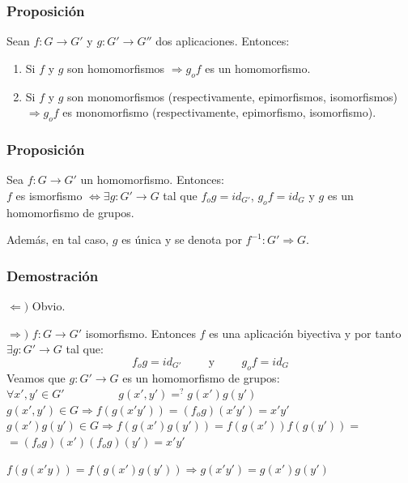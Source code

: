 \documentclass[11pt,a4paper]{article}
\begin{document}

\subsubsection*{Proposición}

Sean $f: G \to G'$ y $g:G' \to G''$ dos aplicaciones. Entonces:
\begin{enumerate}
\item Si $f$ y $g$ son homomorfismos $\Rightarrow g_{o}f$ es un homomorfismo.
\item Si $f$ y $g$ son monomorfismos (respectivamente, epimorfismos, isomorfismos) $\Rightarrow g_{o}f$ es monomorfismo (respectivamente, epimorfismo, isomorfismo).
\end{enumerate}


\subsubsection*{Proposición}

Sea $f: G \to G'$ un homomorfismo. Entonces: \\
$f$ es ismorfismo $\iff \exists g: G' \to G$ tal que $f_{o}g = id_{G'}$, $g_{o}f = id_{G}$ y $g$ es un homomorfismo de grupos.

Además, en tal caso, $g$ es única y se denota por $f^{-1}: G' \Rightarrow G$.

\subsubsection*{Demostración}

\begin{enumerate*}
\item[$\Leftarrow)$] Obvio.
\item[$\Rightarrow)$] $f: G \to G'$ isomorfismo. Entonces $f$ es una aplicación biyectiva y por tanto $\exists g: G' \to G$ tal que:
$$f_{o}g = id_{G'} \hspace{1cm} \text{y} \hspace{1cm} g_{o}f = id_{G}$$
Veamos que $g: G' \to G$ es un homomorfismo de grupos: \\
$\forall x', y' \in G' \hspace{2cm} g(x',y') =^{?} g(x')g(y')$ \\
$g(x',y') \in G \Rightarrow f(g(x'y')) = (f_{o}g)(x'y') = x'y'$ \\
$g(x')g(y') \in G \Rightarrow f(g(x')g(y')) = f(g(x'))f(g(y')) =$ \\ $= (f_{o}g)(x')(f_{o}g)(y') = x'y'$

$f(g(x'y)) = f(g(x')g(y')) \Rightarrow g(x'y') = g(x') g(y')$
\end{enumerate*}
\end{document}
